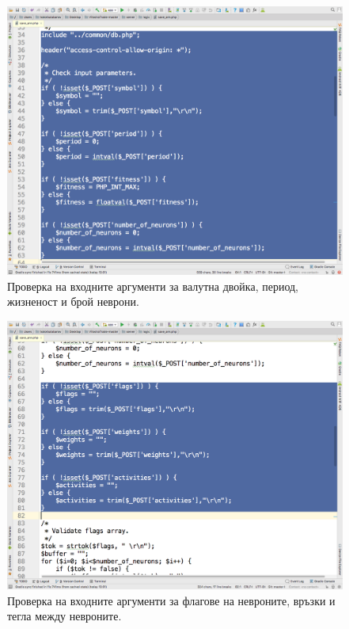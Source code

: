 \documentclass[book,14pt,oneside,openany]{memoir}
\begin{document}
\begin{figure}[h]
  \centering
  \includegraphics[height=0.45\pdfpageheight]{pic0142}
  \caption{Проверка на входните аргументи за валутна двойка, период, жизненост и брой неврони.}
\label{fig:pic0142}
\end{figure}
\FloatBarrier

\begin{figure}[h]
  \centering
  \includegraphics[height=0.45\pdfpageheight]{pic0143}
  \caption{Проверка на входните аргументи за флагове на невроните, връзки и тегла между невроните.}
\label{fig:pic0143}
\end{figure}
\FloatBarrier
\end{document}
